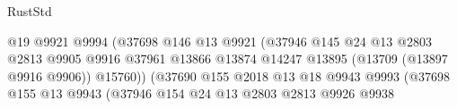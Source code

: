 \begin{lexlean}{RustStd}
\begin{coremodule}
                                                      @19
                                                      @9921
                                                      @9994
                                                      (@37698
                                                        @146
                                                        @13
                                                        @9921
                                                        (@37946
                                                          @145
                                                          @24
                                                          @13
                                                          @2803
                                                          @2813
                                                          @9905
                                                          @9916
                                                          @37961
                                                          @13866
                                                          @13874
                                                          @14247
                                                          @13895
                                                          (@13709 (@13897 @9916 @9906))
                                                          @15760))
                                                      (@37690
                                                        @155
                                                        @2018
                                                        @13
                                                        @18
                                                        @9943
                                                        @9993
                                                        (@37698
                                                          @155
                                                          @13
                                                          @9943
                                                          (@37946
                                                            @154
                                                            @24
                                                            @13
                                                            @2803
                                                            @2813
                                                            @9926
                                                            @9938

\end{coremodule}
\end{lexlean}
